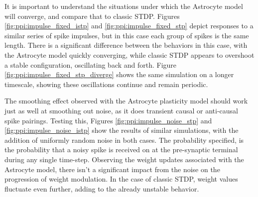 

It is important to understand the situations under which the Astrocyte model
will converge, and compare that to classic STDP. Figures
\ref{fig:ppi:impulse_fixed_istp} and \ref{fig:ppi:impulse_fixed_stp} depict
responses to a similar series of spike impulses, but in this case each group of
spikes is the same length. There is a significant difference between the
behaviors in this case, with the Astrocyte model quickly converging, while
classic STDP appears to overshoot a stable configuration, oscillating back and
forth. Figure \ref{fig:ppi:impulse_fixed_stp_diverge} shows the same simulation
on a longer timescale, showing these oscillations continue and remain periodic.




The smoothing effect observed with the Astrocyte plasticity model should work
just as well at smoothing out noise, as it does transient causal or anti-causal
spike pairings. Testing this, Figures \ref{fig:ppi:impulse_noise_stp} and
\ref{fig:ppi:impulse_noise_istp} show the results of similar simulations, with
the addition of uniformly random noise in both cases. The probability specified,
is the probability that a noisy spike is received on at the pre-synaptic
terminal during any single time-step. Observing the weight updates associated
with the Astrocyte model, there isn't a significant impact from the noise on the
progression of weight modulation. In the case of classic STDP, weight values
fluctuate even further, adding to the already unstable behavior.


